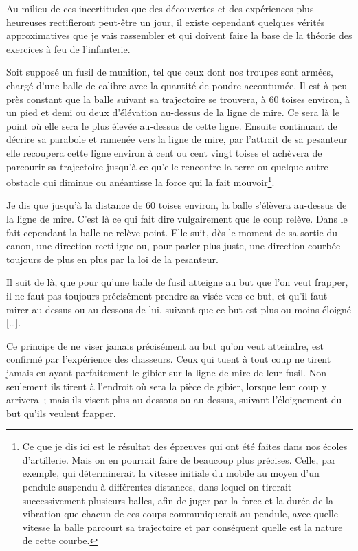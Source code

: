 \documentclass[french,twoside]{book} %
\begin{document}
Au milieu de ces incertitudes que des découvertes et des expériences plus heureuses rectifieront peut-être un jour, il existe cependant quelques vérités approximatives que je vais rassembler et qui doivent faire la base de la théorie des exercices à feu de l’infanterie.\par
Soit supposé un fusil de munition, tel que ceux dont nos troupes sont armées, chargé d’une balle de calibre avec la quantité de poudre accoutumée. Il est à peu près constant que la balle suivant sa trajectoire se trouvera, à 60 toises environ, à un pied et demi ou deux d’élévation au-dessus de la ligne de mire. Ce sera là le point où elle sera le plus élevée au-dessus de cette ligne. Ensuite continuant de décrire sa parabole et ramenée vers la ligne de mire, par l’attrait de sa pesanteur elle recoupera cette ligne environ à cent ou cent vingt toises et achèvera de parcourir sa trajectoire jusqu’à ce qu’elle rencontre la terre ou quelque autre obstacle qui diminue ou anéantisse la force qui la fait mouvoir\footnote{Ce que je dis ici est le résultat des épreuves qui ont été faites dans nos écoles d’artillerie. Mais on en pourrait faire de beaucoup plus précises. Celle, par exemple, qui déterminerait la vitesse initiale du mobile au moyen d’un pendule suspendu à différentes distances, dans lequel on tirerait successivement plusieurs balles, afin de juger par la force et la durée de la vibration que chacun de ces coups communiquerait au pendule, avec quelle vitesse la balle parcourt sa trajectoire et par conséquent quelle est la nature de cette courbe.}.\par
Je dis que jusqu’à la distance de 60 toises environ, la balle s’élèvera au-dessus de la ligne de mire. C’est là ce qui fait dire vulgairement que le coup relève. Dans le fait cependant la balle ne relève point. Elle suit, dès le moment de sa sortie du canon, une direction rectiligne ou, pour parler plus juste, une direction courbée toujours de plus en plus par la loi de la pesanteur.\par
Il suit de là, que pour qu’une balle de fusil atteigne au but que l’on veut frapper, il ne faut pas toujours précisément prendre sa visée vers ce but, et qu’il faut mirer au-dessus ou au-dessous de lui, suivant que ce but est plus ou moins éloigné […].\par
Ce principe de ne viser jamais précisément au but qu’on veut atteindre, est confirmé par l’expérience des chasseurs. Ceux qui tuent à tout coup ne tirent jamais en ayant parfaitement le gibier sur la ligne de mire de leur fusil. Non seulement ils tirent à l’endroit où sera la pièce de gibier, lorsque leur coup y arrivera ; mais ils visent plus au-dessous ou au-dessus, suivant l’éloignement du but qu’ils veulent frapper.\par
\end{document}
